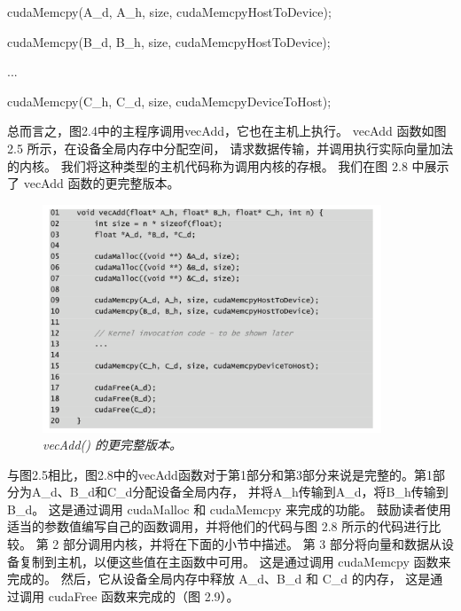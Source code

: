 cudaMemcpy(A\_d, A\_h, size, cudaMemcpyHostToDevice); 

cudaMemcpy(B\_d, B\_h, size, cudaMemcpyHostToDevice); 

...

cudaMemcpy(C\_h, C\_d, size, cudaMemcpyDeviceToHost);

总而言之，图2.4中的主程序调用vecAdd，它也在主机上执行。 vecAdd 函数如图 2.5 所示，在设备全局内存中分配空间，
请求数据传输，并调用执行实际向量加法的内核。 我们将这种类型的主机代码称为调用内核的存根。 
我们在图 2.8 中展示了 vecAdd 函数的更完整版本。

\begin{figure}[H]
	\centering
	\includegraphics[width=0.9\textwidth]{figs/F2.8.png}
	\caption{\textit{vecAdd() 的更完整版本。}}
\end{figure}

与图2.5相比，图2.8中的vecAdd函数对于第1部分和第3部分来说是完整的。第1部分为A\_d、B\_d和C\_d分配设备全局内存，
并将A\_h传输到A\_d，将B\_h传输到B\_d。 这是通过调用 cudaMalloc 和 cudaMemcpy 来完成的功能。 
鼓励读者使用适当的参数值编写自己的函数调用，并将他们的代码与图 2.8 所示的代码进行比较。 
第 2 部分调用内核，并将在下面的小节中描述。 第 3 部分将向量和数据从设备复制到主机，以便这些值在主函数中可用。 
这是通过调用 cudaMemcpy 函数来完成的。 然后，它从设备全局内存中释放 A\_d、B\_d 和 C\_d 的内存，
这是通过调用 cudaFree 函数来完成的（图 2.9）。

